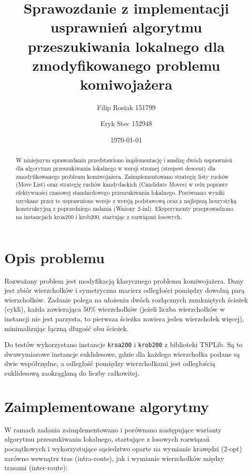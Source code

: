 \documentclass[12pt,a4paper]{article}
\title{Sprawozdanie z implementacji usprawnień algorytmu przeszukiwania lokalnego dla zmodyfikowanego problemu komiwojażera}
\author{Filip Rosiak 151799  \and Eryk Stec 152948}
\date{\today}
\begin{document}
\maketitle

\begin{abstract}
W niniejszym sprawozdaniu przedstawiono implementację i analizę dwóch usprawnień dla algorytmu przeszukiwania lokalnego w wersji stromej (steepest descent) dla zmodyfikowanego problemu komiwojażera. Zaimplementowano strategię listy ruchów (Move List) oraz strategię ruchów kandydackich (Candidate Moves) w celu poprawy efektywności czasowej standardowego przeszukiwania lokalnego. Porównano wyniki uzyskane przez te usprawnione wersje z wersją podstawową oraz z najlepszą heurystyką konstrukcyjną z poprzedniego zadania (Ważony 2-żal). Eksperymenty przeprowadzono na instancjach kroa200 i krob200, startując z rozwiązań losowych.
\end{abstract}

\section{Opis problemu}
Rozważany problem jest modyfikacją klasycznego problemu komiwojażera. Dany jest zbiór wierzchołków i symetryczna macierz odległości pomiędzy dowolną parą wierzchołków. Zadanie polega na ułożeniu dwóch rozłącznych zamkniętych ścieżek (cykli), każda zawierająca 50\% wierzchołków (jeżeli liczba wierzchołków w instancji nie jest parzysta, to pierwsza ścieżka zawiera jeden wierzchołek więcej), minimalizując łączną długość obu ścieżek.

Do testów wykorzystano instancje \texttt{kroa200} i \texttt{krob200} z biblioteki TSPLib. Są to dwuwymiarowe instancje euklidesowe, gdzie dla każdego wierzchołka podane są dwie współrzędne, a odległość pomiędzy wierzchołkami jest odległością euklidesową zaokrąglaną do liczby całkowitej.

\section{Zaimplementowane algorytmy}
W ramach zadania zaimplementowano i porównano następujące warianty algorytmu przeszukiwania lokalnego, startujące z losowych rozwiązań początkowych i wykorzystujące sąsiedztwo oparte na wymianie krawędzi (2-opt) zarówno wewnątrz tras (intra-route), jak i wymianie wierzchołków między trasami (inter-route):
\end{document}

